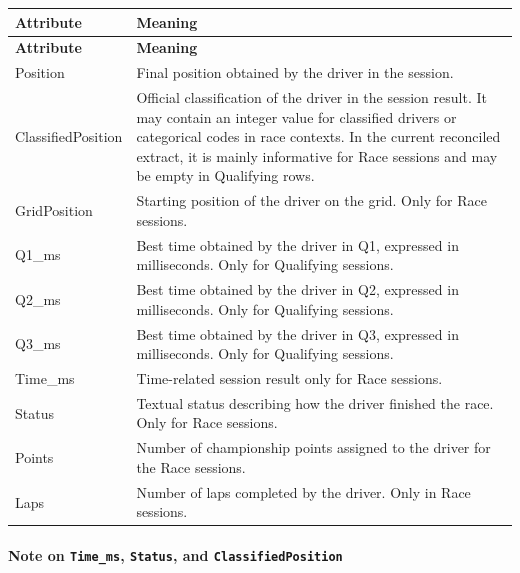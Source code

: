 \documentclass[a4paper,11pt]{article}
\begin{document}
	\begin{longtable}{|p{4cm}|p{10.8cm}|}
		\hline
		\textbf{Attribute} & \textbf{Meaning} \\
		\hline
		\endfirsthead
		
		\hline
		\textbf{Attribute} & \textbf{Meaning} \\
		\hline
		\endhead
		
		Position & Final position obtained by the driver in the session. \\ \hline
		
		ClassifiedPosition & Official classification of the driver in the session result. It may contain an integer value for classified drivers or categorical codes in race contexts. In the current reconciled extract, it is mainly informative for Race sessions and may be empty in Qualifying rows. \\ \hline
		
		GridPosition & Starting position of the driver on the grid. Only for Race sessions. \\ \hline
		
		Q1\_ms & Best time obtained by the driver in Q1, expressed in milliseconds. Only for Qualifying sessions. \\ \hline
		
		Q2\_ms & Best time obtained by the driver in Q2, expressed in milliseconds. Only for Qualifying sessions. \\ \hline
		
		Q3\_ms & Best time obtained by the driver in Q3, expressed in milliseconds. Only for Qualifying sessions. \\ \hline
		
		Time\_ms & Time-related session result only for Race sessions. \\ \hline
		
		Status & Textual status describing how the driver finished the race. Only for Race sessions. \\ \hline
		
		Points & Number of championship points assigned to the driver for the Race sessions. \\ \hline
		
		Laps & Number of laps completed by the driver. Only in Race sessions. \\ \hline
	\end{longtable}
	
	\paragraph*{Note on \texttt{Time\_ms}, \texttt{Status}, and \texttt{ClassifiedPosition}}
	
\end{document}
